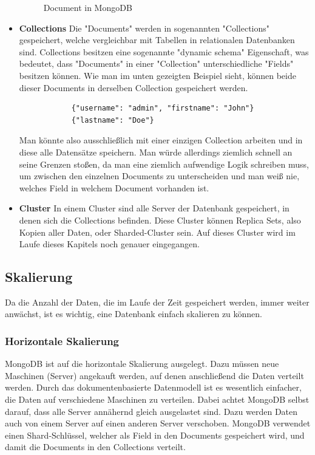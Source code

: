\begin{itemize}
\begin{figure}[h!]
            \caption{Document in MongoDB}
            \cite{mongodb_document}
            \label{fig:enter-label}
        \end{figure}
        \cite{mongodb_json_vs_bson}
        \newpage
    \item \textbf{Collections}
        \newline
        Die "Documents" werden in sogenannten "Collections" gespeichert, welche vergleichbar mit Tabellen in relationalen Datenbanken sind. Collections besitzen eine sogenannte "dynamic schema" Eigenschaft, was bedeutet, dass "Documents" in einer "Collection" unterschiedliche "Fields" besitzen können. Wie man im unten gezeigten Beispiel sieht, können beide dieser Documents in derselben Collection gespeichert werden.
        \begin{lstlisting}
            {"username": "admin", "firstname": "John"}
            {"lastname": "Doe"}
        \end{lstlisting}
        Man könnte also ausschließlich mit einer einzigen Collection arbeiten und in diese alle Datensätze speichern. Man würde allerdings ziemlich schnell an seine Grenzen stoßen, da man eine ziemlich aufwendige Logik schreiben muss, um zwischen den einzelnen Documents zu unterscheiden und man weiß nie, welches Field in welchem Document vorhanden ist.
    \item \textbf{Cluster}
        \newline
        In einem Cluster sind alle Server der Datenbank gespeichert, in denen sich die Collections befinden. Diese Cluster können Replica Sets, also Kopien aller Daten, oder Sharded-Cluster sein. Auf dieses Cluster wird im Laufe dieses Kapitels noch genauer eingegangen.
        \cite{mongodb_collections}
\end{itemize}

\subsection{Skalierung}
Da die Anzahl der Daten, die im Laufe der Zeit gespeichert werden, immer weiter anwächst, ist es wichtig, eine Datenbank einfach skalieren zu können. 

\subsubsection{Horizontale Skalierung}
MongoDB ist auf die horizontale Skalierung ausgelegt. Dazu müssen neue Maschinen (Server) angekauft werden, auf denen anschließend die Daten verteilt werden. Durch das dokumentenbasierte Datenmodell ist es wesentlich einfacher, die Daten auf verschiedene Maschinen zu verteilen. Dabei achtet MongoDB selbst darauf, dass alle Server annähernd gleich ausgelastet sind. Dazu werden Daten auch von einem Server auf einen anderen Server verschoben. MongoDB verwendet einen Shard-Schlüssel, welcher als Field in den Documents gespeichert wird, und damit die Documents in den Collections verteilt.
\cite{mongodb_collections}

